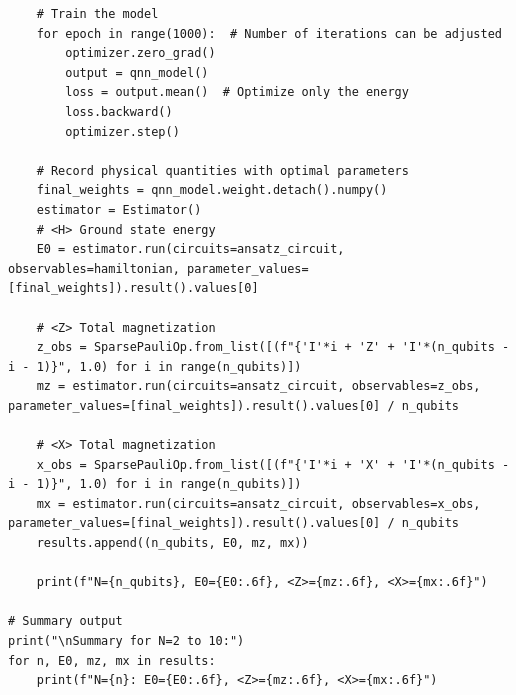 \documentclass[pre,twocolumn,floatfix]{revtex4-1}
\begin{document}
\begin{lstlisting}
    # Train the model
    for epoch in range(1000):  # Number of iterations can be adjusted
        optimizer.zero_grad()
        output = qnn_model()
        loss = output.mean()  # Optimize only the energy
        loss.backward()
        optimizer.step()

    # Record physical quantities with optimal parameters
    final_weights = qnn_model.weight.detach().numpy()
    estimator = Estimator()
    # <H> Ground state energy
    E0 = estimator.run(circuits=ansatz_circuit, observables=hamiltonian, parameter_values=[final_weights]).result().values[0]

    # <Z> Total magnetization
    z_obs = SparsePauliOp.from_list([(f"{'I'*i + 'Z' + 'I'*(n_qubits - i - 1)}", 1.0) for i in range(n_qubits)])
    mz = estimator.run(circuits=ansatz_circuit, observables=z_obs, parameter_values=[final_weights]).result().values[0] / n_qubits

    # <X> Total magnetization
    x_obs = SparsePauliOp.from_list([(f"{'I'*i + 'X' + 'I'*(n_qubits - i - 1)}", 1.0) for i in range(n_qubits)])
    mx = estimator.run(circuits=ansatz_circuit, observables=x_obs, parameter_values=[final_weights]).result().values[0] / n_qubits
    results.append((n_qubits, E0, mz, mx))
    
    print(f"N={n_qubits}, E0={E0:.6f}, <Z>={mz:.6f}, <X>={mx:.6f}")

# Summary output
print("\nSummary for N=2 to 10:")
for n, E0, mz, mx in results:
    print(f"N={n}: E0={E0:.6f}, <Z>={mz:.6f}, <X>={mx:.6f}")
\end{lstlisting}
\end{document}
